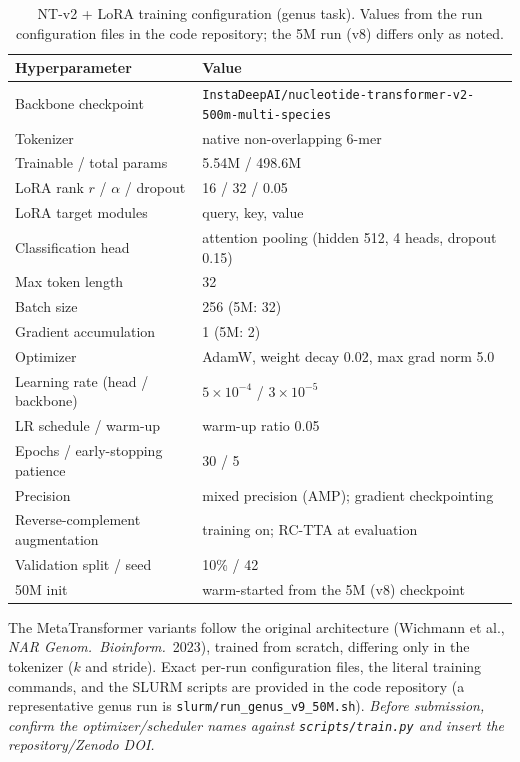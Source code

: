 \documentclass[11pt]{article}
\begin{document}
\begin{table}[h]
\centering
\caption{NT-v2 + LoRA training configuration (genus task). Values from the
run configuration files in the code repository; the 5M run (v8) differs only as
noted.}
\small
\begin{tabularx}{\linewidth}{@{}Xl@{}}
\toprule
Hyperparameter & Value \\
\midrule
Backbone checkpoint & \texttt{InstaDeepAI/nucleotide-transformer-v2-500m-multi-species} \\
Tokenizer & native non-overlapping 6-mer \\
Trainable / total params & 5.54M / 498.6M \\
LoRA rank $r$ / $\alpha$ / dropout & 16 / 32 / 0.05 \\
LoRA target modules & query, key, value \\
Classification head & attention pooling (hidden 512, 4 heads, dropout 0.15) \\
Max token length & 32 \\
Batch size & 256 (5M: 32) \\
Gradient accumulation & 1 (5M: 2) \\
Optimizer & AdamW, weight decay 0.02, max grad norm 5.0 \\
Learning rate (head / backbone) & $5\times10^{-4}$ / $3\times10^{-5}$ \\
LR schedule / warm-up & warm-up ratio 0.05 \\
Epochs / early-stopping patience & 30 / 5 \\
Precision & mixed precision (AMP); gradient checkpointing \\
Reverse-complement augmentation & training on; RC-TTA at evaluation \\
Validation split / seed & 10\% / 42 \\
50M init & warm-started from the 5M (v8) checkpoint \\
\bottomrule
\end{tabularx}
\end{table}

\noindent The MetaTransformer variants follow the original architecture
(Wichmann et al., \textit{NAR Genom.\ Bioinform.}\ 2023), trained from scratch,
differing only in the tokenizer
($k$ and stride). Exact per-run configuration files, the literal training
commands, and the SLURM scripts are provided in the code repository (a
representative genus run is \texttt{slurm/run\_genus\_v9\_50M.sh}). \emph{Before
submission, confirm the optimizer/scheduler names against
\texttt{scripts/train.py} and insert the repository/Zenodo DOI.}
\end{document}
